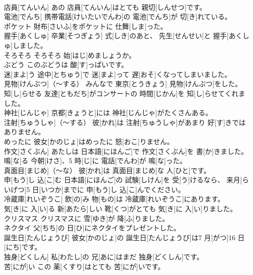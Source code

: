 \documentclass[8pt]{extreport}
\begin{document}
\begin{CJK}{UTF8}{min}
\\	店員[てんいん]	あの 店員[てんいん]はとても 親切[しんせつ]です。		
\\	電池[でんち]	携帯電話[けいたいでんわ]の 電池[でんち]が 切[き]れている。		
\\	ポケット	財布[さいふ]をポケットに 仕舞[しま]った。		
\\	握手[あくしゅ]	卒業[そつぎょう] 式[しき]のあと、 先生[せんせい]と 握手[あくしゅ]しました。		
\\	そろそろ	そろそろ 始[はじ]めましょうか。		
\\	ぶどう	このぶどうは 酸[す]っぱいです。		
\\	迷[まよ]う	途中[とちゅう]で 迷[まよ]って 遅[おそ]くなってしまいました。		
\\	見物[けんぶつ]（～する）	みんなで 東京[とうきょう] 見物[けんぶつ]をした。		
\\	知[し]らせる	友達[ともだち]がコンサートの 時間[じかん]を 知[し]らせてくれました。		
\\	神社[じんじゃ]	京都[きょうと]には 神社[じんじゃ]がたくさんある。		
\\	注射[ちゅうしゃ]（～する）	彼[かれ]は 注射[ちゅうしゃ]があまり 好[す]きではありません。		
\\	めったに	彼女[かのじょ]はめったに 怒[おこ]りません。		
\\	作文[さくぶん]	あたしは 日本語[にほんご]で 作文[さくぶん]を 書[か]きました。		
\\	鳴[な]る	今朝[けさ]、5 時[じ]に 電話[でんわ]が 鳴[な]った。		
\\	真面目[まじめ]（～な）	彼[かれ]は 真面目[まじめ]な 人[ひと]です。		
\\	申[もう]し 込[こ]む	日本語[にほんご]の 試験[しけん]を 受[う]けるなら、 来月[らいげつ]5 日[いつか]までに 申[もう]し 込[こ]んでください。		
\\	冷蔵庫[れいぞうこ]	飲[の]み 物[もの]は 冷蔵庫[れいぞうこ]にあります。		
\\	気[き]に 入[い]る	新[あたら]しい 靴[くつ]がとても 気[き]に 入[い]りました。		
\\	クリスマス	クリスマスに 雪[ゆき]が 降[ふ]りました。		
\\	ネクタイ	父[ちち]の 日[ひ]にネクタイをプレゼントした。		
\\	誕生日[たんじょうび]	彼女[かのじょ]の 誕生日[たんじょうび]は7 月[がつ]16 日[にち]です。		
\\	独身[どくしん]	私[わたし]の 兄[あに]はまだ 独身[どくしん]です。		
\\	苦[にが]い	この 薬[くすり]はとても 苦[にが]いです。		

\end{CJK}
\end{document}

